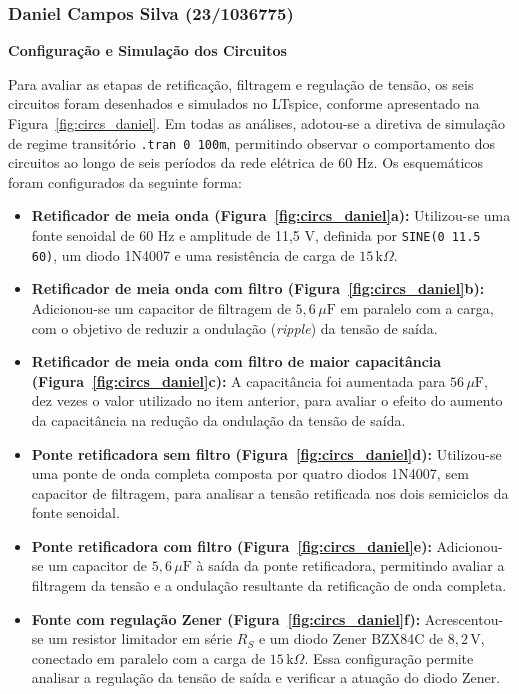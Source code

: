 \documentclass[11pt,a4paper]{article}
\begin{document}
\subsubsection{Daniel Campos Silva (23/1036775)}

\textbf{Configuração e Simulação dos Circuitos}

Para avaliar as etapas de retificação, filtragem e regulação de tensão, os seis circuitos foram desenhados e simulados no LTspice, conforme apresentado na Figura~\ref{fig:circs_daniel}. Em todas as análises, adotou-se a diretiva de simulação de regime transitório \texttt{.tran 0 100m}, permitindo observar o comportamento dos circuitos ao longo de seis períodos da rede elétrica de 60 Hz. Os esquemáticos foram configurados da seguinte forma:

\begin{itemize}
    \item \textbf{Retificador de meia onda (Figura~\ref{fig:circs_daniel}a):} Utilizou-se uma fonte senoidal de 60 Hz e amplitude de 11,5 V, definida por \texttt{SINE(0 11.5 60)}, um diodo 1N4007 e uma resistência de carga de \(15\,\text{k}\Omega\).

    \item \textbf{Retificador de meia onda com filtro (Figura~\ref{fig:circs_daniel}b):} Adicionou-se um capacitor de filtragem de \(5{,}6\,\mu\text{F}\) em paralelo com a carga, com o objetivo de reduzir a ondulação (\textit{ripple}) da tensão de saída.

    \item \textbf{Retificador de meia onda com filtro de maior capacitância (Figura~\ref{fig:circs_daniel}c):} A capacitância foi aumentada para \(56\,\mu\text{F}\), dez vezes o valor utilizado no item anterior, para avaliar o efeito do aumento da capacitância na redução da ondulação da tensão de saída.

    \item \textbf{Ponte retificadora sem filtro (Figura~\ref{fig:circs_daniel}d):} Utilizou-se uma ponte de onda completa composta por quatro diodos 1N4007, sem capacitor de filtragem, para analisar a tensão retificada nos dois semiciclos da fonte senoidal.

    \item \textbf{Ponte retificadora com filtro (Figura~\ref{fig:circs_daniel}e):} Adicionou-se um capacitor de \(5{,}6\,\mu\text{F}\) à saída da ponte retificadora, permitindo avaliar a filtragem da tensão e a ondulação resultante da retificação de onda completa.

    \item \textbf{Fonte com regulação Zener (Figura~\ref{fig:circs_daniel}f):} Acrescentou-se um resistor limitador em série \(R_S\) e um diodo Zener BZX84C de \(8{,}2\,\text{V}\), conectado em paralelo com a carga de \(15\,\text{k}\Omega\). Essa configuração permite analisar a regulação da tensão de saída e verificar a atuação do diodo Zener.
\end{itemize}
\end{document}
